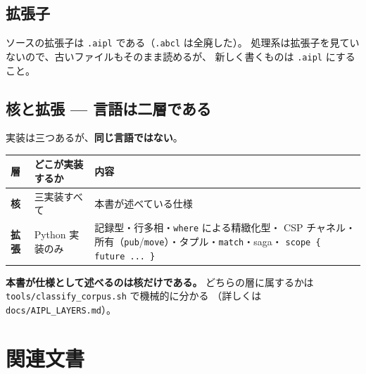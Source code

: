 \documentclass[11pt,a4paper]{ltjsarticle}
\begin{document}
\subsection{拡張子}

ソースの拡張子は \texttt{.aipl} である（\texttt{.abcl} は全廃した）。
処理系は拡張子を見ていないので、古いファイルもそのまま読めるが、
新しく書くものは \texttt{.aipl} にすること。

\subsection{核と拡張 --- 言語は二層である}

実装は三つあるが、\textbf{同じ言語ではない}。

\begin{center}
\small
\begin{tabular}{@{}lp{4.0cm}p{5.4cm}@{}}
\toprule
層 & どこが実装するか & 内容 \\
\midrule
\textbf{核} & 三実装すべて & 本書が述べている仕様 \\
\textbf{拡張} & Python 実装のみ & 記録型・行多相・\texttt{where} による精緻化型・
  CSP チャネル・所有（\texttt{pub}/\texttt{move}）・タプル・\texttt{match}・saga・
  \texttt{scope \{ future ... \}} \\
\bottomrule
\end{tabular}
\end{center}

\textbf{本書が仕様として述べるのは核だけである。}
どちらの層に属するかは \texttt{tools/classify\_corpus.sh} で機械的に分かる
（詳しくは \texttt{docs/AIPL\_LAYERS.md}）。

\section{関連文書}
\end{document}
